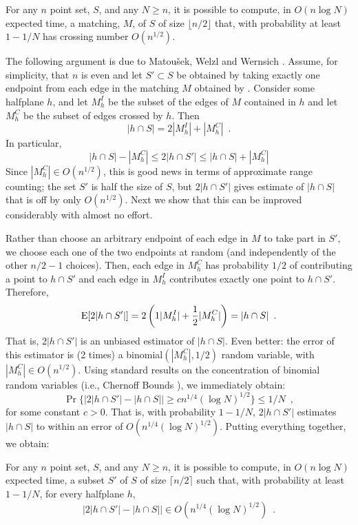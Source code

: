 \documentclass{patmorin}
\begin{document}
\begin{cor}
  For any $n$ point set, $S$, and any $N\ge n$, it is possible to
  compute, in $O(n\log N)$ expected time, a matching, $M$, of $S$ of
  size $\lfloor n/2\rfloor$ that, with probability at least $1-1/N$
  has crossing number $O(n^{1/2})$.
\end{cor}

The following argument is due to Matou\v{s}ek, Welzl and Wernsich
\cite[Lemma~2.5]{mww93}.  Assume, for simplicity, that $n$ is even and let
$S'\subset S$ be obtained by taking exactly one endpoint from each edge in
the matching $M$ obtained by .  Consider some halfplane
$h$,  and let $M^{I}_h$ be the subset of the edges of $M$ contained in
$h$ and let $M^{C}_h$ be the subset of edges crossed by $h$. Then
\[
     |h\cap S| = 2|M^{I}_h| + |M^{C}_h| \enspace .
\] 
In particular,
\[
     |h\cap S| - |M^{C}_h| \le 2|h\cap S'| \le |h\cap S| + |M^{C}_h| 
\]
Since $|M^C_h|\in O(n^{1/2})$, this is good news in terms of approximate
range counting;  the set $S'$ is half the size of $S$, but $2|h\cap
S'|$ gives estimate of $|h\cap S|$ that is off by only $O(n^{1/2})$.
Next we show that this can be improved considerably with almost no effort.

Rather than choose an arbitrary endpoint of each edge in $M$ to
take part in $S'$, we choose each one of the two endpoints at random
(and independently of the other $n/2-1$ choices).  Then, each edge in
$M^{C}_h$ has probability $1/2$ of contributing a point to $h\cap S'$
and each edge in $M^{I}_h$ contributes exactly one point to $h\cap S'$.
Therefore,
\[
    \mathrm{E}[2|h\cap S'|]
      = 2\left(1|M^{I}_h| + \frac{1}{2}|M^{C}_h|\right) = |h\cap S| \enspace .
\]
That is, $2|h\cap S'|$ is an unbiased estimator of $|h\cap
S|$.  Even better: the error of this estimator is (2 times) a
binomial$(|M^{C}_h|,1/2)$ random variable, with $|M^{C}_h|\in O(n^{1/2})$.
Using standard results on the concentration of binomial random variables
(i.e., Chernoff Bounds \cite{c52}), we immediately obtain:
\[
   \Pr\{\left|2|h \cap S'| - |h\cap S|\right| \ge c n^{1/4}(\log N)^{1/2}\} 
       \le 1/N \enspace ,
\]
for some constant $c>0$.  That is, with probability $1-1/N$, $2|h\cap S'|$
estimates $|h\cap S|$ to within an error of $O(n^{1/4}(\log N)^{1/2})$.
Putting everything together, we obtain:

\begin{lem}
  For any $n$ point set, $S$, and any $N\ge n$, it is possible to
  compute, in $O(n\log N)$ expected time, a subset $S'$ of $S$ of 
  size $\lceil n/2\rceil$ such that, 
  with probability at least $1-1/N$, for every halfplane $h$,
  \[
     \left|2|h\cap S'| - |h\cap S|\right| \in O(n^{1/4}(\log N)^{1/2}) \enspace .
  \]
\end{lem}
\end{document}
